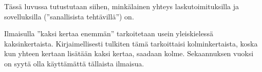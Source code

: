 Tässä luvussa tutustutaan siihen, minkälainen yhteys laskutoimituksilla ja sovelluksilla (''sanallisista tehtävillä'') on.


Ilmaisulla ''kaksi kertaa enemmän'' tarkoitetaan usein yleiskielessä kaksinkertaista. Kirjaimellisesti tulkiten tämä tarkoittaisi kolminkertaista, koska kun yhteen kertaan lisätään kaksi kertaa, saadaan kolme. Sekaannuksen vuoksi on syytä olla käyttämättä tällaista ilmaisua.

